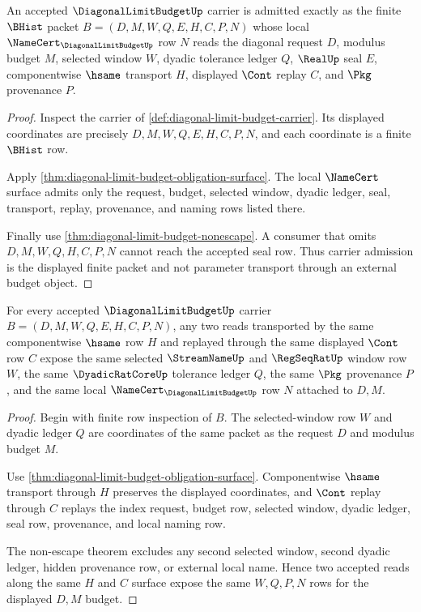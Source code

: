 \begin{theorem}
\label{thm:diagonal-limit-budget-carrier-admission}
An accepted $\DiagonalLimitBudgetUp$ carrier is admitted exactly as the finite $\BHist$ packet $B=(D,M,W,Q,E,H,C,P,N)$ whose local $\NameCert_{\DiagonalLimitBudgetUp}$ row $N$ reads the diagonal request $D$, modulus budget $M$, selected window $W$, dyadic tolerance ledger $Q$, $\RealUp$ seal $E$, componentwise $\hsame$ transport $H$, displayed $\Cont$ replay $C$, and $\Pkg$ provenance $P$.
\end{theorem}
\begin{proof}
Inspect the carrier of \autoref{def:diagonal-limit-budget-carrier}. Its displayed coordinates are precisely $D,M,W,Q,E,H,C,P,N$, and each coordinate is a finite $\BHist$ row.

Apply \autoref{thm:diagonal-limit-budget-obligation-surface}. The local $\NameCert$ surface admits only the request, budget, selected window, dyadic ledger, seal, transport, replay, provenance, and naming rows listed there.

Finally use \autoref{thm:diagonal-limit-budget-nonescape}. A consumer that omits $D,M,W,Q,H,C,P,N$ cannot reach the accepted seal row. Thus carrier admission is the displayed finite packet and not parameter transport through an external budget object.
\end{proof}

\begin{theorem}
\label{thm:diagonal-limit-budget-synchronization-stability}
For every accepted $\DiagonalLimitBudgetUp$ carrier $B=(D,M,W,Q,E,H,C,P,N)$, any two reads transported by the same componentwise $\hsame$ row $H$ and replayed through the same displayed $\Cont$ row $C$ expose the same selected $\StreamNameUp$ and $\RegSeqRatUp$ window row $W$, the same $\DyadicRatCoreUp$ tolerance ledger $Q$, the same $\Pkg$ provenance $P$, and the same local $\NameCert_{\DiagonalLimitBudgetUp}$ row $N$ attached to $D,M$.
\end{theorem}
\begin{proof}
Begin with finite row inspection of $B$. The selected-window row $W$ and dyadic ledger $Q$ are coordinates of the same packet as the request $D$ and modulus budget $M$.

Use \autoref{thm:diagonal-limit-budget-obligation-surface}. Componentwise $\hsame$ transport through $H$ preserves the displayed coordinates, and $\Cont$ replay through $C$ replays the index request, budget row, selected window, dyadic ledger, seal row, provenance, and local naming row.

The non-escape theorem excludes any second selected window, second dyadic ledger, hidden provenance row, or external local name. Hence two accepted reads along the same $H$ and $C$ surface expose the same $W,Q,P,N$ rows for the displayed $D,M$ budget.
\end{proof}

